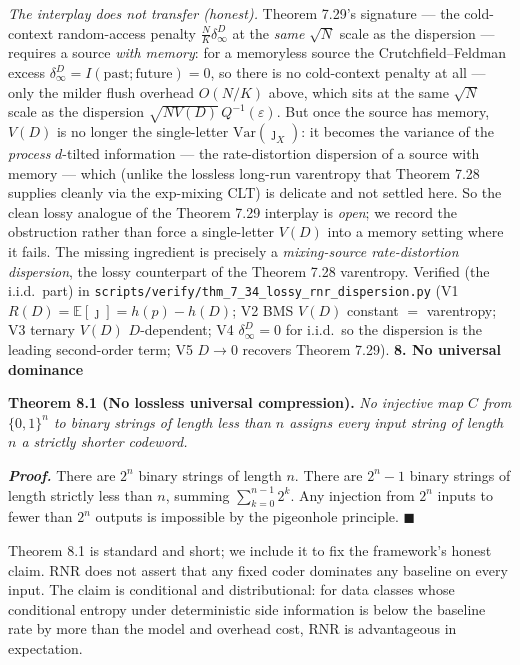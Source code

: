 \documentclass[
]{article}
\begin{document}
\emph{The interplay does not transfer (honest).} Theorem 7.29's signature --- the
cold-context random-access penalty $\tfrac NK\delta_\infty^D$ at the \emph{same} $\sqrt N$
scale as the dispersion --- requires a source \emph{with memory}: for a memoryless source
the Crutchfield--Feldman excess $\delta_\infty^D=I(\text{past};\text{future})=0$, so there
is no cold-context penalty at all --- only the milder flush overhead $O(N/K)$ above, which
sits at the same $\sqrt N$ scale as the dispersion $\sqrt{N V(D)}\,Q^{-1}(\varepsilon)$.
But once the source has memory, $V(D)$ is no
longer the single-letter $\mathrm{Var}(\jmath_X)$: it becomes the variance of the
\emph{process} $d$-tilted information --- the rate-distortion dispersion of a source with
memory --- which (unlike the lossless long-run varentropy that Theorem 7.28 supplies
cleanly via the exp-mixing CLT) is delicate and not settled here. So the clean lossy
analogue of the Theorem 7.29 interplay is \emph{open}; we record the obstruction rather
than force a single-letter $V(D)$ into a memory setting where it fails. The missing
ingredient is precisely a \emph{mixing-source rate-distortion dispersion}, the lossy
counterpart of the Theorem 7.28 varentropy. Verified (the i.i.d.\ part) in
\texttt{scripts/verify/thm\_7\_34\_lossy\_rnr\_dispersion.py} (V1 $R(D)=\mathbb E[\jmath]
=h(p)-h(D)$; V2 BMS $V(D)$ constant $=$ varentropy; V3 ternary $V(D)$ $D$-dependent; V4
$\delta_\infty^D=0$ for i.i.d.\ so the dispersion is the leading second-order term; V5
$D\to0$ recovers Theorem 7.29).
\textbf{8. No universal dominance}

\textbf{Theorem 8.1 (No lossless universal compression).} \emph{No
injective map $C$ from $\{0,1\}^n$ to binary strings of length less
than $n$ assigns every input string of length $n$ a strictly shorter
codeword.}

\emph{\textbf{Proof.}} There are $2^n$ binary strings of length $n$.
There are $2^n - 1$ binary strings of length strictly less than $n$,
summing $\sum_{k=0}^{n-1} 2^k$. Any injection from $2^n$ inputs to
fewer than $2^n$ outputs is impossible by the pigeonhole principle.
\hfill$\blacksquare$

Theorem 8.1 is standard and short; we include it to fix the
framework's honest claim. RNR does not assert that any fixed coder
dominates any baseline on every input. The claim is conditional and
distributional: for data classes whose conditional entropy under
deterministic side information is below the baseline rate by more than
the model and overhead cost, RNR is advantageous in expectation.
\end{document}
